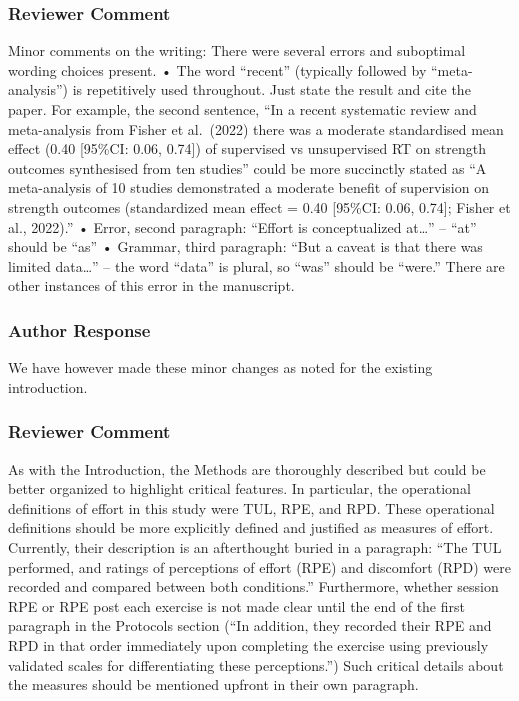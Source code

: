 \documentclass[
  letterpaper,
  DIV=11,
  numbers=noendperiod]{scrartcl}
\begin{document}
\hypertarget{reviewer-comment-4}{%
\subsubsection{Reviewer Comment}\label{reviewer-comment-4}}

Minor comments on the writing: There were several errors and suboptimal
wording choices present. • The word ``recent'' (typically followed by
``meta-analysis'') is repetitively used throughout. Just state the
result and cite the paper. For example, the second sentence, ``In a
recent systematic review and meta-analysis from Fisher et al.~(2022)
there was a moderate standardised mean effect (0.40 {[}95\%CI: 0.06,
0.74{]}) of supervised vs unsupervised RT on strength outcomes
synthesised from ten studies'' could be more succinctly stated as ``A
meta-analysis of 10 studies demonstrated a moderate benefit of
supervision on strength outcomes (standardized mean effect = 0.40
{[}95\%CI: 0.06, 0.74{]}; Fisher et al., 2022).'' • Error, second
paragraph: ``Effort is conceptualized at\ldots{}'' -- ``at'' should be
``as'' • Grammar, third paragraph: ``But a caveat is that there was
limited data\ldots{}'' -- the word ``data'' is plural, so ``was'' should
be ``were.'' There are other instances of this error in the manuscript.

\hypertarget{author-response-4}{%
\subsubsection{Author Response}\label{author-response-4}}

We have however made these minor changes as noted for the existing
introduction.

\hypertarget{reviewer-comment-5}{%
\subsubsection{Reviewer Comment}\label{reviewer-comment-5}}

As with the Introduction, the Methods are thoroughly described but could
be better organized to highlight critical features. In particular, the
operational definitions of effort in this study were TUL, RPE, and RPD.
These operational definitions should be more explicitly defined and
justified as measures of effort. Currently, their description is an
afterthought buried in a paragraph: ``The TUL performed, and ratings of
perceptions of effort (RPE) and discomfort (RPD) were recorded and
compared between both conditions.'' Furthermore, whether session RPE or
RPE post each exercise is not made clear until the end of the first
paragraph in the Protocols section (``In addition, they recorded their
RPE and RPD in that order immediately upon completing the exercise using
previously validated scales for differentiating these perceptions.'')
Such critical details about the measures should be mentioned upfront in
their own paragraph.
\end{document}
